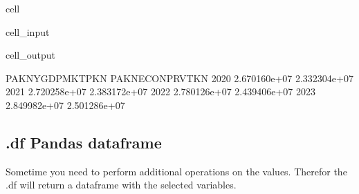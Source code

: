 \documentclass[letterpaper,10pt,english]{jupyterBook}
\begin{document}
\begin{sphinxuseclass}{cell}\begin{sphinxVerbatimInput}

\begin{sphinxuseclass}{cell_input}
\begin{sphinxVerbatim}[commandchars=\\\{\}]
\PYG{p}{[}\PYG{p}{]} 
\end{sphinxVerbatim}

\end{sphinxuseclass}\end{sphinxVerbatimInput}
\begin{sphinxVerbatimOutput}

\begin{sphinxuseclass}{cell_output}
\begin{sphinxVerbatim}[commandchars=\\\{\}]
      PAKNYGDPMKTPKN  PAKNECONPRVTKN
2020    2.670160e+07    2.332304e+07
2021    2.720258e+07    2.383172e+07
2022    2.780126e+07    2.439406e+07
2023    2.849982e+07    2.501286e+07
\end{sphinxVerbatim}

\end{sphinxuseclass}\end{sphinxVerbatimOutput}

\end{sphinxuseclass}

\subsection{.df  Pandas dataframe}
\label{\detokenize{content/Python/modelflow_features:df-pandas-dataframe}}
\sphinxAtStartPar
Sometime you need to perform additional operations on the values. Therefor the .df will return a dataframe with the selected variables.
\end{document}
